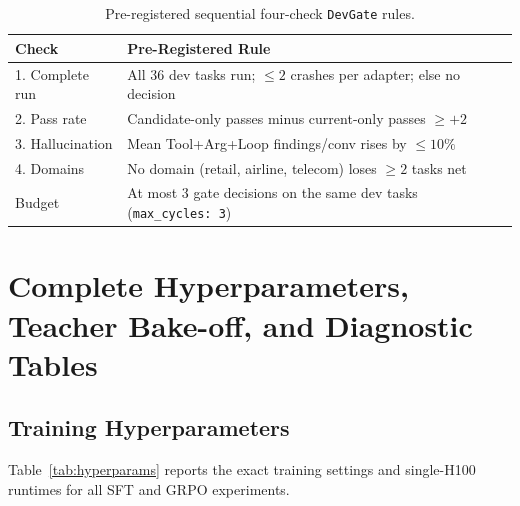 \documentclass[11pt]{article}
\begin{document}
\begin{table}[h]
\centering
\footnotesize
\setlength{\tabcolsep}{4pt}
\begin{tabular}{lp{4.8cm}}
\toprule
\textbf{Check} & \textbf{Pre-Registered Rule} \\
\midrule
1. Complete run & All 36 dev tasks run; $\le 2$ crashes per adapter; else no decision \\
2. Pass rate & Candidate-only passes minus current-only passes $\ge +2$ \\
3. Hallucination & Mean Tool+Arg+Loop findings/conv rises by $\le 10\%$ \\
4. Domains & No domain (retail, airline, telecom) loses $\ge 2$ tasks net \\
Budget & At most 3 gate decisions on the same dev tasks (\texttt{max\_cycles: 3}) \\
\bottomrule
\end{tabular}
\caption{Pre-registered sequential four-check \texttt{DevGate} rules.}
\label{tab:gate_rules}
\end{table}

\section{Complete Hyperparameters, Teacher Bake-off, and Diagnostic Tables}
\label{app:tables}

\subsection{Training Hyperparameters}
\label{app:hyperparams}
Table~\ref{tab:hyperparams} reports the exact training settings and single-H100 runtimes for all SFT and GRPO experiments.
\end{document}
